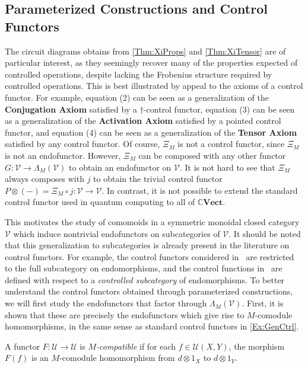 \subsection{Parameterized Constructions and Control Functors}
%
The circuit diagrams obtains from \cref{Thm:XiProps} and \cref{Thm:XiTensor} are of particular interest, as they seemingly recover many of the properties expected of controlled operations, despite lacking the Frobenius structure required by controlled operations.
This is best illustrated by appeal to the axioms of a control functor.
For example, equation (2) can be seen as a generalization of the \textbf{Conjugation Axiom} satisfied by a $\dagger$-control functor, equation (3) can be seen as a generalization of the \textbf{Activation Axiom} satisfied by a pointed control functor, and equation (4) can be seen as a generalization of the \textbf{Tensor Axiom} satisfied by any control functor.
Of course, $\Xi_M$ is not a control functor, since $\Xi_M$ is not an endofunctor.
However, $\Xi_M$ can be composed with any other functor $G: \mathcal{V} \to \Lambda_M( \mathcal{V} )$ to obtain an endofunctor on $\mathcal{V}$.
It is not hard to see that $\Xi_M$ always composes with $j$ to obtain the trivial control functor $P \otimes ( - ) = \Xi_M \circ j: \mathcal{V} \to \mathcal{V}$.
In contrast, it is not possible to extend the standard control functor used in quantum computing to all of $\mathbb{C}\mathbf{Vect}$.

This motivates the study of comomoids in a symmetric monoidal closed category $\mathcal{V}$ which induce nontrivial endofunctors on subcategories of $\mathcal{V}$.
It should be noted that this generalization to subcategories is already present in the literature on control functors.
For example, the control functors considered in~\cite{Delorme2026} are restricted to the full subcategory on endomorphisms, and the control functions in~\cite{FuKishida2022} are defined with respect to a \emph{controlled subcategory} of endomorphisms.
To better understand the control functors obtained through parameterized constructions, we will first study the endofunctors that factor through $\Lambda_M( \mathcal{V} )$.
First, it is shown that these are precisely the endofunctors which give rise to $M$-comodule homomorphisms, in the same sense as standard control functors in \cref{Ex:GenCtrl}.

\begin{defi}
    A functor $F: \mathcal{U} \to \mathcal{U}$ is \emph{$M$-compatible} if for each $f \in \mathcal{U}( X, Y )$, the morphism $F( f )$ is an $M$-comodule homomorphism from $d \otimes 1_{X}$ to $d \otimes 1_{Y}$.
\end{defi}


